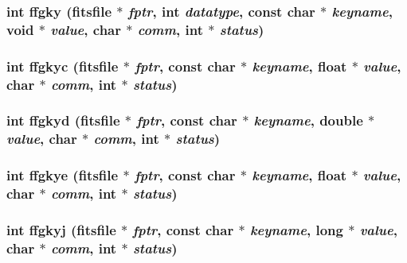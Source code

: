 \subsubsection{\setlength{\rightskip}{0pt plus 5cm}int ffgky (\bf{fitsfile} $\ast$ {\em fptr}, int {\em datatype}, const char $\ast$ {\em keyname}, void $\ast$ {\em value}, char $\ast$ {\em comm}, int $\ast$ {\em status})}\label{fitsio_8h_1432368d15be90a252a794df7f9ad09c}


\subsubsection{\setlength{\rightskip}{0pt plus 5cm}int ffgkyc (\bf{fitsfile} $\ast$ {\em fptr}, const char $\ast$ {\em keyname}, float $\ast$ {\em value}, char $\ast$ {\em comm}, int $\ast$ {\em status})}\label{fitsio_8h_647528834240eb725de251c7cec34850}


\subsubsection{\setlength{\rightskip}{0pt plus 5cm}int ffgkyd (\bf{fitsfile} $\ast$ {\em fptr}, const char $\ast$ {\em keyname}, double $\ast$ {\em value}, char $\ast$ {\em comm}, int $\ast$ {\em status})}\label{fitsio_8h_7f11b595f4dd81df24a8e0f95198e9d0}


\subsubsection{\setlength{\rightskip}{0pt plus 5cm}int ffgkye (\bf{fitsfile} $\ast$ {\em fptr}, const char $\ast$ {\em keyname}, float $\ast$ {\em value}, char $\ast$ {\em comm}, int $\ast$ {\em status})}\label{fitsio_8h_765b39f911a7fa630490fcc7c22b7da7}


\subsubsection{\setlength{\rightskip}{0pt plus 5cm}int ffgkyj (\bf{fitsfile} $\ast$ {\em fptr}, const char $\ast$ {\em keyname}, long $\ast$ {\em value}, char $\ast$ {\em comm}, int $\ast$ {\em status})}\label{fitsio_8h_390adabb4fae20ebb831ef865b10cab7}


